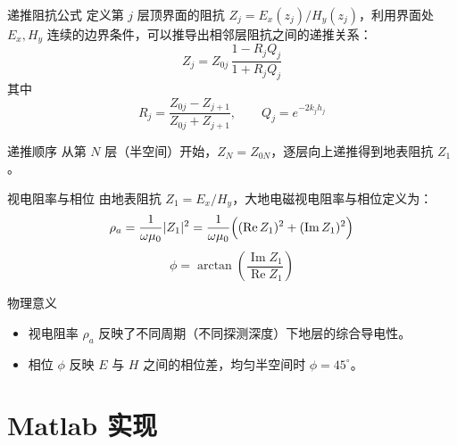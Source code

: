 \documentclass[10pt,aspectratio=169,fontset=none]{ctexbeamer}
\begin{document}
    \begin{frame}{递推阻抗公式}
        定义第 $j$ 层顶界面的阻抗 $Z_j = E_x(z_j)/H_y(z_j)$，利用界面处 $E_x,H_y$ 连续的边界条件，可以推导出相邻层阻抗之间的递推关系：
        \begin{equation}
            Z_j = Z_{0j}\,\frac{1 - R_j Q_j}{1 + R_j Q_j}
        \end{equation}
        其中
        \begin{equation}
            R_j = \frac{Z_{0j} - Z_{j+1}}{Z_{0j} + Z_{j+1}},\qquad
            Q_j = e^{-2k_j h_j}
        \end{equation}
        \vspace{0.2em}
        \begin{talert}{递推顺序}
            从第 $N$ 层（半空间）开始，$Z_{N}=Z_{0N}$，逐层向上递推得到地表阻抗 $Z_1$。
        \end{talert}
    \end{frame}

    \begin{frame}{视电阻率与相位}
        由地表阻抗 $Z_1=E_x/H_y$，大地电磁视电阻率与相位定义为：
        \begin{equation}
            \rho_a = \frac{1}{\omega \mu_0} |Z_1|^2
            = \frac{1}{\omega \mu_0}\Bigl( (\operatorname{Re} Z_1)^2 + (\operatorname{Im} Z_1)^2 \Bigr)
        \end{equation}
        \begin{equation}
            \phi = \arctan\!\left( \frac{\operatorname{Im} Z_1}{\operatorname{Re} Z_1} \right)
        \end{equation}
        \vspace{0.3em}
        \begin{block}{物理意义}
            \begin{itemize}
                \item 视电阻率 $\rho_a$ 反映了不同周期（不同探测深度）下地层的综合导电性。
                \item 相位 $\phi$ 反映 $E$ 与 $H$ 之间的相位差，均匀半空间时 $\phi=45^\circ$。
            \end{itemize}
        \end{block}
    \end{frame}

    \section{Matlab 实现}
\end{document}
